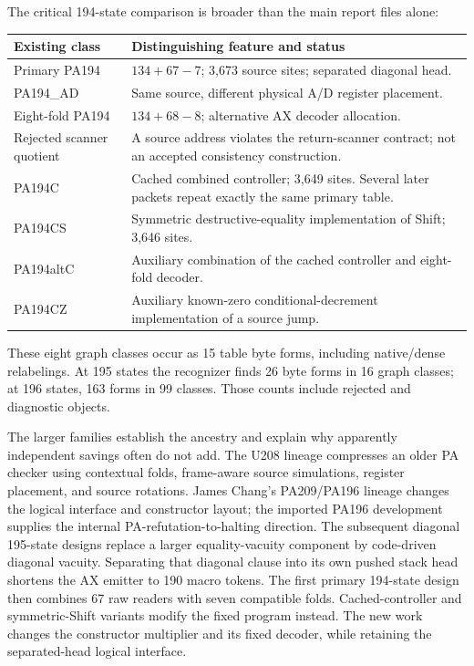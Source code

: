 \documentclass[10pt,letterpaper]{article}
\begin{document}
The critical 194-state comparison is broader than the main report files alone:

\begin{center}\small
\begin{tabularx}{\linewidth}{@{}lX@{}}
\toprule
Existing class & Distinguishing feature and status \\
\midrule
Primary PA194 & $134+67-7$; 3,673 source sites; separated diagonal head. \\
PA194\_AD & Same source, different physical A/D register placement. \\
Eight-fold PA194 & $134+68-8$; alternative AX decoder allocation. \\
Rejected scanner quotient & A source address violates the return-scanner contract; not an accepted consistency construction. \\
PA194C & Cached combined controller; 3,649 sites. Several later packets repeat exactly the same primary table. \\
PA194CS & Symmetric destructive-equality implementation of Shift; 3,646 sites. \\
PA194altC & Auxiliary combination of the cached controller and eight-fold decoder. \\
PA194CZ & Auxiliary known-zero conditional-decrement implementation of a source jump. \\
\bottomrule
\end{tabularx}
\end{center}

These eight graph classes occur as 15 table byte forms, including native/dense relabelings. At 195 states the recognizer finds 26 byte forms in 16 graph classes; at 196 states, 163 forms in 99 classes. Those counts include rejected and diagnostic objects.

The larger families establish the ancestry and explain why apparently independent savings often do not add. The U208 lineage compresses an older PA checker using contextual folds, frame-aware source simulations, register placement, and source rotations. James Chang's PA209/PA196 lineage changes the logical interface and constructor layout; the imported PA196 development supplies the internal PA-refutation-to-halting direction. The subsequent diagonal 195-state designs replace a larger equality-vacuity component by code-driven diagonal vacuity. Separating that diagonal clause into its own pushed stack head shortens the AX emitter to 190 macro tokens. The first primary 194-state design then combines 67 raw readers with seven compatible folds. Cached-controller and symmetric-Shift variants modify the fixed program instead. The new work changes the constructor multiplier and its fixed decoder, while retaining the separated-head logical interface.
\end{document}
